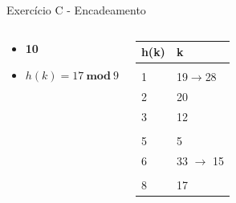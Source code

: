 \documentclass{beamer}
\begin{document}
\begin{frame}{Exercício C - Encadeamento}
\begin{columns}
        \footnotesize         
        \begin{block}{}
 		 \begin{itemize}
 		  \item \textbf{10}
 		  \item $h(k) = 17 \ \mathbf{mod} \ 9$  
 		 \end{itemize}

 		  \end{block} 
    
        \begin{table}[]
        \centering
        \footnotesize
        \begin{tabular}{|l|l|}
        \hline
        h(k) & k \\ \hline
            &   \\ \hline
        1   & 19$\rightarrow$28  \\ \hline
        2   & 20  \\ \hline
        3   & 12   \\ \hline
            &    \\ \hline
        5   & 5   \\ \hline
        6   & 33 $\rightarrow$ 15   \\ \hline
            &   \\ \hline
        8   & 17  \\ \hline
        \end{tabular}%

        \end{table}       
        \end{columns}
\end{frame}
\end{document}
